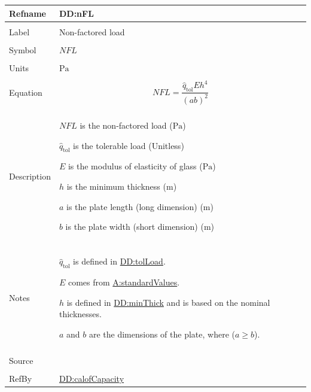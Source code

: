 \documentclass[12pt]{article}
\begin{document}
\begin{minipage}{\textwidth}
\begin{tabular}{>{\raggedright}p{}>{\raggedright\arraybackslash}p{}}
\toprule \textbf{Refname} & \textbf{DD:nFL}
\label{DD:nFL}
\\ \midrule \\
Label & Non-factored load
        
\\ \midrule \\
Symbol & $\mathit{NFL}$
         
\\ \midrule \\
Units & ${\text{Pa}}$
        
\\ \midrule \\
Equation & \begin{displaymath}
           \mathit{NFL}=\frac{{\hat{q}_{\text{tol}}} E h^{4}}{\left(a b\right)^{2}}
           \end{displaymath}
\\ \midrule \\
Description & \begin{symbDescription}
              \item{$\mathit{NFL}$ is the non-factored load (${\text{Pa}}$)}
              \item{${\hat{q}_{\text{tol}}}$ is the tolerable load (Unitless)}
              \item{$E$ is the modulus of elasticity of glass (${\text{Pa}}$)}
              \item{$h$ is the minimum thickness (${\text{m}}$)}
              \item{$a$ is the plate length (long dimension) (${\text{m}}$)}
              \item{$b$ is the plate width (short dimension) (${\text{m}}$)}
              \end{symbDescription}
\\ \midrule \\
Notes & ${\hat{q}_{\text{tol}}}$ is defined in \hyperref[DD:tolLoad]{DD:tolLoad}.
        
        $E$ comes from \hyperref[assumpSV]{A:standardValues}.
        
        $h$ is defined in \hyperref[DD:minThick]{DD:minThick} and is based on the nominal thicknesses.
        
        $a$ and $b$ are the dimensions of the plate, where ($a\geq{}b$).
        
\\ \midrule \\
Source & \cite{astm2009}
         
\\ \midrule \\
RefBy & \hyperref[DD:calofCapacity]{DD:calofCapacity}
        
\\ \bottomrule
\end{tabular}
\end{minipage}
\end{document}

